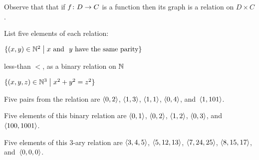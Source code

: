 \documentclass{ibl}  %
\begin{document}
Observe that that if $\mbox{$f\colon D\to C$}$ is a function then 
its graph is a relation on $D\times C$.

\begin{problem}
List five elements of each relation:
\begin{items}
\item $\{(x,y)\in \mathbb{N}^2 \bigm| \text{$x$ and ~$y$ have the same parity}\}$
\item less-than $<$, as a binary relation on $\mathbb{N}$
\item $\{(x,y,z)\in\mathbb{N}^3 \bigm| x^2+y^2=z^2\}$
\end{items}
\begin{answer}
\begin{items}
\item Five pairs from the relation are
  $\langle0,2\rangle$, $\langle1,3\rangle$, $\langle1,1\rangle$, 
  $\langle0,4\rangle$, 
 and~$\langle1,101\rangle$.    
\item Five elements of this binary relation are 
  $\langle0,1\rangle$, $\langle0,2\rangle$, $\langle1,2\rangle$, $\langle0,3\rangle$,
  and~$\langle100,1001\rangle$. 
\item Five elements of this $3$-ary relation are
  $\langle3,4,5\rangle$, $\langle5,12,13\rangle$, $\langle7,24,25\rangle$, 
  $\langle8,15,17\rangle$, and~$\langle0,0,0\rangle$.
\end{items}
\end{answer}
\end{problem}
\end{document}
